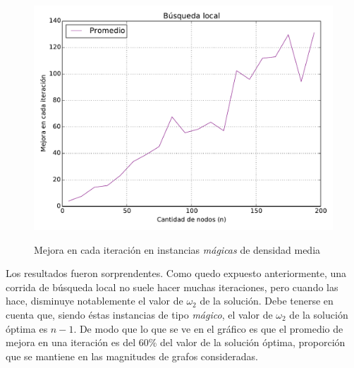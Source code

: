 \begin{figure}[H]
\begin{center}
\includegraphics[angle=0, scale=.70]{imagenes/local_search-mejora.pdf}
\label{grafico local}
\caption{Mejora en cada iteración en instancias \textit{mágicas} de densidad media}
\end{center}
\end{figure}

Los resultados fueron sorprendentes. Como quedo expuesto anteriormente, una corrida de búsqueda local no suele hacer muchas iteraciones, pero cuando las hace, disminuye notablemente el valor de $\omega_2$ de la solución. Debe tenerse en cuenta que, siendo éstas instancias de tipo \textit{mágico}, el valor de $\omega_2$ de la solución óptima es $n-1$. De modo que lo que se ve en el gráfico es que el promedio de mejora en una iteración es del 60\% del valor de la solución óptima, proporción que se mantiene en las magnitudes de grafos consideradas.

